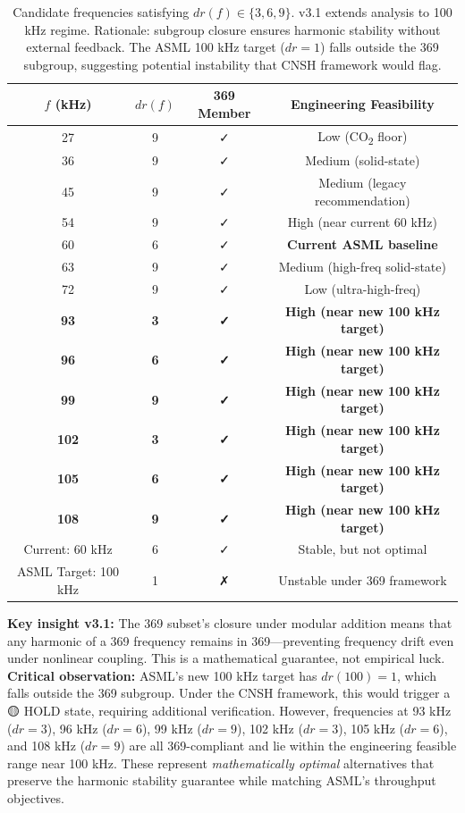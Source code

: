 \documentclass[twocolumn]{article}
\begin{document}
\begin{table}[h]
\centering
\begin{tabular}{|c|c|c|c|}
\hline
$f$ (kHz) & $dr(f)$ & 369 Member & Engineering Feasibility \\
\hline
27 & 9 & ✓ & Low (CO\textsubscript{2} floor) \\
36 & 9 & ✓ & Medium (solid-state) \\
45 & 9 & ✓ & Medium (legacy recommendation) \\
54 & 9 & ✓ & High (near current 60 kHz) \\
60 & 6 & ✓ & \textbf{Current ASML baseline} \\
63 & 9 & ✓ & Medium (high-freq solid-state) \\
72 & 9 & ✓ & Low (ultra-high-freq) \\
\textbf{93} & \textbf{3} & \textbf{✓} & \textbf{High (near new 100 kHz target)} \\
\textbf{96} & \textbf{6} & \textbf{✓} & \textbf{High (near new 100 kHz target)} \\
\textbf{99} & \textbf{9} & \textbf{✓} & \textbf{High (near new 100 kHz target)} \\
\textbf{102} & \textbf{3} & \textbf{✓} & \textbf{High (near new 100 kHz target)} \\
\textbf{105} & \textbf{6} & \textbf{✓} & \textbf{High (near new 100 kHz target)} \\
\textbf{108} & \textbf{9} & \textbf{✓} & \textbf{High (near new 100 kHz target)} \\
\hline
Current: 60 kHz & 6 & ✓ & Stable, but not optimal \\
ASML Target: 100 kHz & 1 & ✗ & Unstable under 369 framework \\
\hline
\end{tabular}
\caption{Candidate frequencies satisfying $dr(f) \in \{3,6,9\}$. v3.1 extends analysis to 100 kHz regime. Rationale: subgroup closure ensures harmonic stability without external feedback. The ASML 100 kHz target ($dr=1$) falls outside the 369 subgroup, suggesting potential instability that CNSH framework would flag.}
\end{table}

\textbf{Key insight v3.1:} The 369 subset's closure under modular addition means that any harmonic of a 369 frequency remains in 369—preventing frequency drift even under nonlinear coupling. This is a mathematical guarantee, not empirical luck. \textbf{Critical observation:} ASML's new 100 kHz target has $dr(100) = 1$, which falls outside the 369 subgroup. Under the CNSH framework, this would trigger a 🟡 HOLD state, requiring additional verification. However, frequencies at 93 kHz ($dr=3$), 96 kHz ($dr=6$), 99 kHz ($dr=9$), 102 kHz ($dr=3$), 105 kHz ($dr=6$), and 108 kHz ($dr=9$) are all 369-compliant and lie within the engineering feasible range near 100 kHz. These represent \emph{mathematically optimal} alternatives that preserve the harmonic stability guarantee while matching ASML's throughput objectives.
\end{document}
